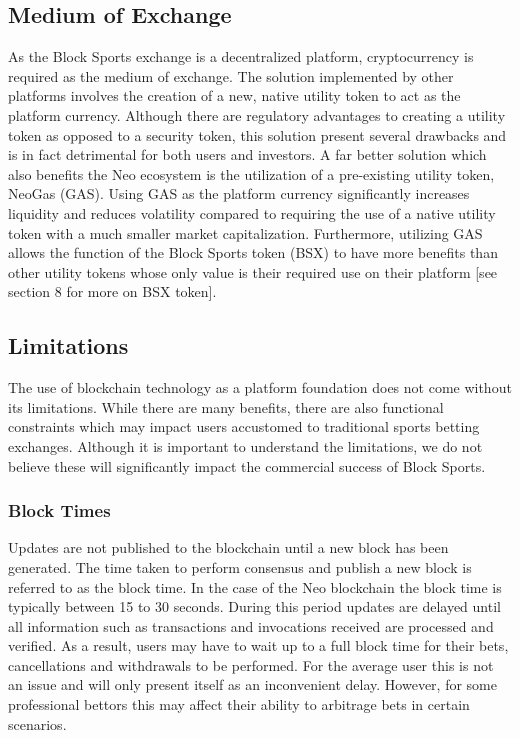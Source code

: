 \documentclass{article}
\begin{document}
	\subsection{Medium of Exchange}
As the Block Sports exchange is a decentralized platform, cryptocurrency is required as the medium of exchange. The solution implemented by other platforms involves the creation of a new, native utility token to act as the platform currency. Although there are regulatory advantages to creating a utility token as opposed to a security token, this solution present several drawbacks and is in fact detrimental for both users and investors. A far better solution which also benefits the Neo ecosystem is the utilization of a pre-existing utility token, NeoGas (GAS). Using GAS as the platform currency significantly increases liquidity and reduces volatility compared to requiring the use of a native utility token with a much smaller market capitalization. Furthermore, utilizing GAS allows the function of the Block Sports token (BSX) to have more benefits than other utility tokens whose only value is their required use on their platform [see section 8 for more on BSX token].

	\subsection{Limitations}
The use of blockchain technology as a platform foundation does not come without its limitations. While there are many benefits, there are also functional constraints which may impact users accustomed to traditional sports betting exchanges. Although it is important to understand the limitations, we do not believe these will significantly impact the commercial success of Block Sports.  

		\subsubsection{Block Times}
Updates are not published to the blockchain until a new block has been generated. The time taken to perform consensus and publish a new block is referred to as the block time. In the case of the Neo blockchain the block time is typically between 15 to 30 seconds. During this period updates are delayed until all information such as transactions and invocations received are processed and verified. As a result, users may have to wait up to a full block time for their bets, cancellations and withdrawals to be performed. For the average user this is not an issue and will only present itself as an inconvenient delay. However, for some professional bettors this may affect their ability to arbitrage bets in certain scenarios.
\end{document}
